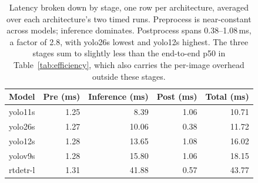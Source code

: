 \begin{table}[t]
  \centering
  \caption{Latency broken down by stage, one row per architecture, averaged over each architecture's two timed runs. Preprocess is near-constant across models; inference dominates. Postprocess spans 0.38--1.08\,ms, a factor of 2.8, with yolo26s lowest and yolo12s highest. The three stages sum to slightly less than the end-to-end p50 in Table~\ref{tab:efficiency}, which also carries the per-image overhead outside these stages.}
  \label{tab:latency-breakdown}
  \begin{tabular}{lrrrr}
    \toprule
    Model & Pre (ms) & Inference (ms) & Post (ms) & Total (ms) \\
    \midrule
    yolo11s & 1.25 & 8.39 & 1.06 & 10.71 \\
    yolo26s & 1.27 & 10.06 & 0.38 & 11.72 \\
    yolo12s & 1.28 & 13.65 & 1.08 & 16.02 \\
    yolov9s & 1.28 & 15.80 & 1.06 & 18.15 \\
    rtdetr-l & 1.31 & 41.88 & 0.57 & 43.77 \\
    \bottomrule
  \end{tabular}
\end{table}
